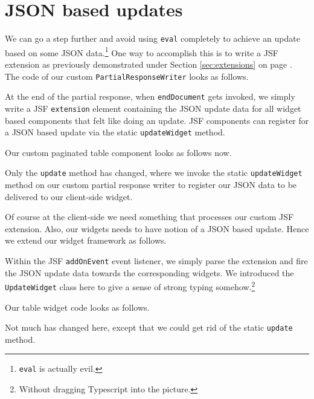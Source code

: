\section{JSON based updates}
We can go a step further and avoid using \texttt{eval} completely to achieve an update based on some JSON data.\footnote{\texttt{eval} is actually evil.}
One way to accomplish this is to write a JSF extension as previously demonstrated under Section \ref{sec:extensions} on page \pageref{sec:extensions}.
The code of our custom \texttt{PartialResponseWriter} looks as follows.

At the end of the partial response, when \texttt{endDocument} gets invoked, we simply write a JSF \texttt{extension} element containing the JSON update data for all widget based components that felt like doing an update.
JSF components can register for a JSON based update via the static \texttt{updateWidget} method.

Our custom paginated table component looks as follows now.

Only the \texttt{update} method has changed, where we invoke the static \texttt{updateWidget} method on our custom partial response writer to register our JSON data to be delivered to our client-side widget.

Of course at the client-side we need something that processes our custom JSF extension.
Also, our widgets needs to have notion of a JSON based update.
Hence we extend our widget framework as follows.

Within the JSF \texttt{addOnEvent} event listener, we simply parse the extension and fire the JSON update data towards the corresponding widgets.
We introduced the \texttt{UpdateWidget} class here to give a sense of strong typing somehow.\footnote{Without dragging Typescript into the picture.}

Our table widget code looks as follows.

Not much has changed here, except that we could get rid of the static \texttt{update} method.


